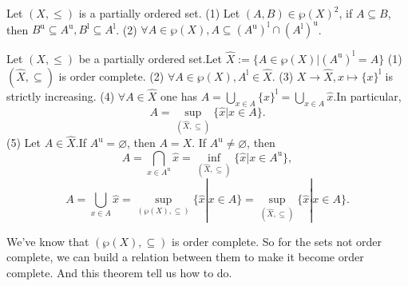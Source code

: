 \documentclass{book}
\numberwithin{equation}{section}
\begin{document}
\begin{lemmaenv}
    Let $(X, \le)$ is a partially ordered set.
    \newline
    (1) Let $(A, B)\in \wp(X)^2$,  if $A\subseteq B$,  then $B^\mathrm{u}\subseteq A^\mathrm{u}, B^\mathrm{l}\subseteq A^\mathrm{l}$.
    \newline
    (2) $\forall A\in \wp(X), A\subseteq (A^\mathrm{u})^\mathrm{l}\cap (A^\mathrm{l})^\mathrm{u}$.
\end{lemmaenv}

\begin{theoremenv}
    \quad
    \newline
    Let $(X, \le )$ be a partially ordered set.Let $\hat{X}:=\{A\in \wp (X)|(A^\mathrm{u})^\mathrm{l}=A\}$
\newline
(1) $(\hat{X}, \subseteq)$ is order complete.
\newline
(2) $\forall A\in \wp(X), A^\mathrm{l}\in \hat{X}$.
\newline
(3) $X\rightarrow \hat{X}, x\mapsto \{x\}^\mathrm{l}$ is strictly increasing.
\newline
(4) $\forall A\in \hat{X}$ one has $A=\bigcup_{x\in A}\{x\}^\mathrm{l}=\bigcup_{x\in A}\hat{x}$.In particular,  
$$A=\sup_{(\hat{X}, \subseteq)}\{\hat{x}|x\in A\}.$$
(5) Let $A\in \hat{X}$.If $A^\mathrm{u}=\varnothing$,  then $A=X$. If $A^\mathrm{u}\not=\varnothing$, then 
$$A=\bigcap_{x\in A^\mathrm{u}}\hat{x}=\inf_{(\hat{X}, \subseteq)}\{\hat{x}|x\in A^\mathrm{u}\}, $$
$$A=\bigcup_{x\in A}\hat{x}=\sup_{(\wp(X), \subseteq)}\{\hat{x}|x\in A\}=\sup_{(\hat{X}, \subseteq)}\{\hat{x}|x\in A\}.$$
\end{theoremenv}
\begin{remark}
    We've know that $(\wp(X), \subseteq)$ is order complete. So for the sets not order complete,  we can build a relation between them to make it become order complete. And this theorem tell us how to do.
\end{remark}
\end{document}
